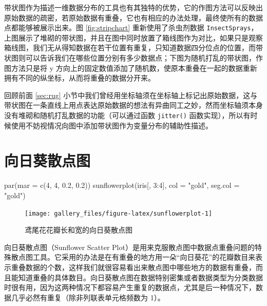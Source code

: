 \documentclass[
  b5paper,
  UTF8,twoside]{book}
\newenvironment{Shaded}{\begin{snugshade}}{\end{snugshade}}
\newcommand{\AttributeTok}[1]{\textcolor[rgb]{0.77,0.63,0.00}{#1}}
\newcommand{\DecValTok}[1]{\textcolor[rgb]{0.00,0.00,0.81}{#1}}
\newcommand{\FloatTok}[1]{\textcolor[rgb]{0.00,0.00,0.81}{#1}}
\newcommand{\FunctionTok}[1]{\textcolor[rgb]{0.00,0.00,0.00}{#1}}
\newcommand{\NormalTok}[1]{#1}
\newcommand{\SpecialCharTok}[1]{\textcolor[rgb]{0.00,0.00,0.00}{#1}}
\newcommand{\StringTok}[1]{\textcolor[rgb]{0.31,0.60,0.02}{#1}}
\begin{document}
带状图作为描述一维数据分布的工具也有其独特的优势，它的作图方法可以反映出原始数据的疏密，若原始数据有重叠，它也有相应的办法处理，最终使所有的数据点都能够被展示出来。图 \ref{fig:stripchart}
重新使用了杀虫剂数据 \texttt{InsectSprays}，上图展示了堆砌的带状图，并且在图中同时放置了箱线图作为对比，如果只是观察箱线图，我们无从得知数据在若干位置有重复，只知道数据四分位点的位置，而带状图则可以告诉我们在哪些位置分别有多少数据点；下图为随机打乱的带状图，作图方法只是将 y 方向上的固定数值添加了随机数，使原本重叠在一起的数据重新拥有不同的纵坐标，从而将重叠的数据分开来。

回顾前面 \ref{sec:rug} 小节中我们曾经用坐标轴须在坐标轴上标记出原始数据，这与带状图在一条直线上用点表达原始数据的想法有异曲同工之妙，然而坐标轴须本身没有堆砌和随机打乱数据的功能（可以通过函数 \texttt{jitter()} 函数实现），所以有时候使用不妨视情况向图中添加带状图作为变量分布的辅助性描述。

\hypertarget{sec:sunflowerplot}{%
\section{向日葵散点图}\label{sec:sunflowerplot}}





\begin{Shaded}
\begin{Highlighting}[]
\FunctionTok{par}\NormalTok{(}\AttributeTok{mar =} \FunctionTok{c}\NormalTok{(}\DecValTok{4}\NormalTok{, }\DecValTok{4}\NormalTok{, }\FloatTok{0.2}\NormalTok{, }\FloatTok{0.2}\NormalTok{))}
\FunctionTok{sunflowerplot}\NormalTok{(iris[, }\DecValTok{3}\SpecialCharTok{:}\DecValTok{4}\NormalTok{], }\AttributeTok{col =} \StringTok{"gold"}\NormalTok{, }\AttributeTok{seg.col =} \StringTok{"gold"}\NormalTok{)}
\end{Highlighting}
\end{Shaded}

\begin{figure}

{\centering \texttt{[image: gallery\_files/figure-latex/sunflowerplot-1]} 

}

\caption[鸢尾花花瓣长和宽的向日葵散点图]{鸢尾花花瓣长和宽的向日葵散点图}\label{fig:sunflowerplot}
\end{figure}

向日葵散点图（Sunflower Scatter Plot）是用来克服散点图中数据点重叠问题的特殊散点图工具。它采用的办法是在有重叠的地方用一朵``向日葵花''的花瓣数目来表示重叠数据的个数，这样我们就很容易看出来散点图中哪些地方的数据有重叠，而且能知道重叠的具体数目。向日葵散点图在数据特别密集或者数据类型为分类数据时很有用，因为这两种情况下都容易产生重复的数据点，尤其是后一种情况下，数据几乎必然有重复（除非列联表单元格频数为 1）。
\end{document}

